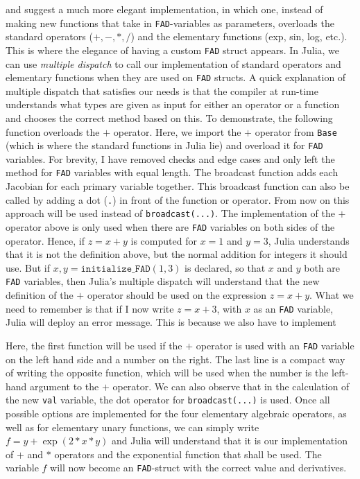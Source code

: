 \cite{doi:10.1137/080743627} and \cite{lieMrstUrl} suggest a much more elegant implementation, in which one, instead of making new functions that take in \texttt{FAD}-variables as parameters, overloads the standard operators ($+,-,*,/$) and the elementary functions (exp, sin, log, etc.). This is where the elegance of having a custom \texttt{FAD} struct appears. In Julia, we can use \emph{multiple dispatch} to call our implementation of standard operators and elementary functions when they are used on \texttt{FAD} structs. A quick explanation of multiple dispatch that satisfies our needs is that the compiler at run-time understands what types are given as input for either an operator or a function and chooses the correct method based on this. To demonstrate, the following function  
overloads the $+$ operator. Here, we import the $+$ operator from \texttt{Base} (which is where the standard functions in Julia lie) and overload it for \texttt{FAD} variables. For brevity, I have removed checks and edge cases and only left the method for \texttt{FAD} variables with equal length. The broadcast function adds each Jacobian for each primary variable together. This broadcast function can also be called by adding a dot (\texttt{.}) in front of the function or operator. From now on this approach will be used instead of \texttt{broadcast(...)}. The implementation of the $+$ operator above is only used when there are \texttt{FAD} variables on both sides of the operator. Hence, if $z = x+y$ is computed for $x = 1$ and $y = 3$, Julia understands that it is not the definition above, but the normal addition for integers it should use. But if $x,y = \texttt{initialize\_FAD}(1,3)$ is declared, so that $x$ and $y$ both are \texttt{FAD} variables, then Julia's multiple dispatch will understand that the new definition of the $+$ operator should be used on the expression $z = x+y$. What we need to remember is that if I now write $z = x + 3$, with $x$ as an \texttt{FAD} variable, Julia will deploy an error message. This is because we also have to implement

Here, the first function will be used if the $+$ operator is used with an \texttt{FAD} variable on the left hand side and a number on the right. The last line is a compact way of writing the opposite function, which will be used when the number is the left-hand argument to the $+$ operator. We can also observe that in the calculation of the new \texttt{val} variable, the dot operator for \texttt{broadcast(...)} is used. Once all possible options are implemented for the four elementary algebraic operators, as well as for elementary unary functions, we can simply write $f = y+\exp(2*x*y)$ and Julia will understand that it is our implementation of $+$ and $*$ operators and the exponential function that shall be used. The variable $f$ will now become an \texttt{FAD}-struct with the correct value and derivatives. 

